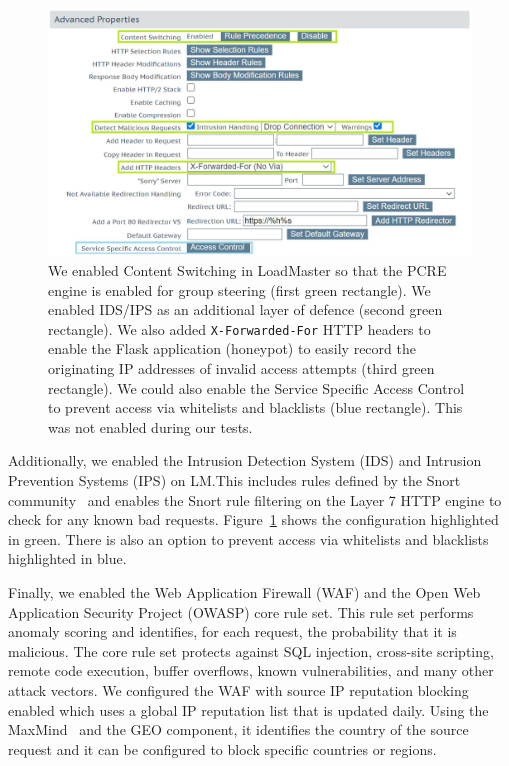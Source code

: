 \begin{figure}
  \centerline{\includegraphics[width=\textwidth]{img/loadmaster-ids-ips}}
  \caption{We enabled Content Switching in LoadMaster so that the PCRE
    engine is enabled for group steering (first green rectangle).  We
    enabled IDS/IPS as an additional layer of defence (second green
    rectangle).  We also added \texttt{X-Forwarded-For} HTTP headers
    to enable the Flask application (honeypot) to easily record the
    originating IP addresses of invalid access attempts (third green
    rectangle).  We could also enable the Service Specific Access
    Control to prevent access via whitelists and blacklists (blue
    rectangle).  This was not enabled during our
    tests.}\label{fig:loadmaster-ids-ips}
\end{figure}

Additionally, we enabled the Intrusion Detection System (IDS) and
Intrusion Prevention Systems (IPS) on LM.\@ This includes rules
defined by the Snort community~\cite{cisco-snort-xx} and enables the
Snort rule filtering on the Layer 7 HTTP engine to check for any known
bad requests.  Figure~\ref{fig:loadmaster-ids-ips} shows the
configuration highlighted in green.  There is also an option to
prevent access via whitelists and blacklists highlighted in blue.

Finally, we enabled the Web Application Firewall (WAF) and the Open
Web Application Security Project (OWASP) core rule set.  This rule set
performs anomaly scoring and identifies, for each request, the
probability that it is malicious.  The core rule set protects against
SQL injection, cross-site scripting, remote code execution, buffer
overflows, known vulnerabilities, and many other attack vectors.  We
configured the WAF with source IP reputation blocking enabled which
uses a global IP reputation list that is updated daily.  Using the
MaxMind~\cite{maxmind-xx} and the GEO component, it identifies the
country of the source request and it can be configured to block
specific countries or regions.

